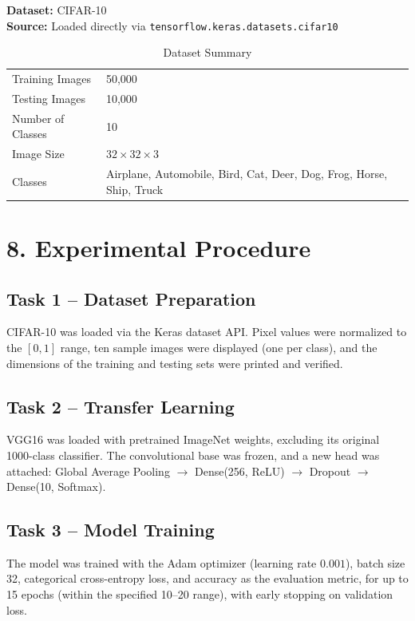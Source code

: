 \documentclass[11pt]{article}
\begin{document}
\textbf{Dataset:} CIFAR-10\\
\textbf{Source:} Loaded directly via \texttt{tensorflow.keras.datasets.cifar10}

\begin{table}[H]
\centering
\caption{Dataset Summary}
\begin{tabular}{ll}
\toprule
Training Images & 50,000 \\
Testing Images & 10,000 \\
Number of Classes & 10 \\
Image Size & $32\times32\times3$ \\
Classes & Airplane, Automobile, Bird, Cat, Deer, Dog, Frog, Horse, Ship, Truck \\
\bottomrule
\end{tabular}
\end{table}


\section*{8. Experimental Procedure}

\subsection*{Task 1 -- Dataset Preparation}
CIFAR-10 was loaded via the Keras dataset API. Pixel values were normalized to the $[0,1]$ range, ten sample images were displayed (one per class), and the dimensions of the training and testing sets were printed and verified.

\subsection*{Task 2 -- Transfer Learning}
VGG16 was loaded with pretrained ImageNet weights, excluding its original 1000-class classifier. The convolutional base was frozen, and a new head was attached: Global Average Pooling $\rightarrow$ Dense(256, ReLU) $\rightarrow$ Dropout $\rightarrow$ Dense(10, Softmax).

\subsection*{Task 3 -- Model Training}
The model was trained with the Adam optimizer (learning rate $0.001$), batch size 32, categorical cross-entropy loss, and accuracy as the evaluation metric, for up to 15 epochs (within the specified 10--20 range), with early stopping on validation loss.
\end{document}
